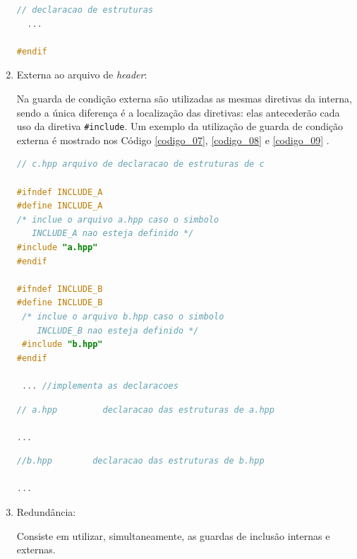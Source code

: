 \begin{enumerate}
\begin{lstlisting}[language=C++,caption={
                        Arquivo a.hpp contendo guardas de inclusão interna},
                                                            label=codigo_06]
  // declaracao de estruturas 
  ...

#endif
\end{lstlisting}


\item Externa ao arquivo de \textit{header}:
 
Na  guarda de condição externa  são utilizadas as mesmas diretivas da interna,
 sendo a única diferença é a localização das diretivas: elas antecederão cada uso
 da diretiva \texttt{\#include}. Um exemplo da utilização de guarda de condição 
externa é mostrado nos Código \ref{codigo_07}, \ref{codigo_08} e
 \ref{codigo_09} \cite[pág. 80]{ref42}.


\begin{lstlisting}[language=C++,caption={
					    Arquivo c.hpp contendo guardas de inclusão externa},
                                                            label=codigo_07]
// c.hpp arquivo de declaracao de estruturas de c

#ifndef INCLUDE_A
#define INCLUDE_A
/* inclue o arquivo a.hpp caso o simbolo 
   INCLUDE_A nao esteja definido */
#include "a.hpp"
#endif
        
#ifndef INCLUDE_B
#define INCLUDE_B
 /* inclue o arquivo b.hpp caso o simbolo 
    INCLUDE_B nao esteja definido */
 #include "b.hpp"
#endif

 ... //implementa as declaracoes

\end{lstlisting}

\begin{lstlisting}[language=C++,caption={
						   Arquivo a.hpp com guarda de inclusão externa},
                                                         label=codigo_08]
// a.hpp         declaracao das estruturas de a.hpp

...

\end{lstlisting}

\begin{lstlisting}[language=C++,caption={
					         Arquivo b.hpp com guarda de inclusão externa},
                                                           label=codigo_09]
//b.hpp        declaracao das estruturas de b.hpp

...

\end{lstlisting}


\item Redundância:\label{redundancia_melhor}

Consiste em utilizar, simultaneamente, as guardas de inclusão internas e 
externas. 


\end{enumerate}
